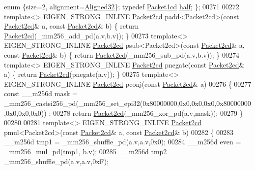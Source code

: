 \begin{DoxyCode}
{      enum} \{size=2, alignment=\hyperlink{group__enums_gga45fe06e29902b7a2773de05ba27b47a1a7797d247b86f6e9837cc338beb6060de}{Aligned32}\}; \textcolor{keyword}{typedef} \hyperlink{struct_eigen_1_1internal_1_1_packet1cd}{Packet1cd} \hyperlink{struct_eigen_1_1internal_1_1_packet1cd}{half}; \};
00271 
00272 \textcolor{keyword}{template}<> EIGEN\_STRONG\_INLINE \hyperlink{struct_eigen_1_1internal_1_1_packet2cd}{Packet2cd} padd<Packet2cd>(\textcolor{keyword}{const} 
      \hyperlink{struct_eigen_1_1internal_1_1_packet2cd}{Packet2cd}& a, \textcolor{keyword}{const} \hyperlink{struct_eigen_1_1internal_1_1_packet2cd}{Packet2cd}& b) \{ \textcolor{keywordflow}{return} \hyperlink{struct_eigen_1_1internal_1_1_packet2cd}{Packet2cd}(\_mm256\_add\_pd(a.v,b.v)); \}
00273 \textcolor{keyword}{template}<> EIGEN\_STRONG\_INLINE \hyperlink{struct_eigen_1_1internal_1_1_packet2cd}{Packet2cd} psub<Packet2cd>(\textcolor{keyword}{const} 
      \hyperlink{struct_eigen_1_1internal_1_1_packet2cd}{Packet2cd}& a, \textcolor{keyword}{const} \hyperlink{struct_eigen_1_1internal_1_1_packet2cd}{Packet2cd}& b) \{ \textcolor{keywordflow}{return} \hyperlink{struct_eigen_1_1internal_1_1_packet2cd}{Packet2cd}(\_mm256\_sub\_pd(a.v,b.v)); \}
00274 \textcolor{keyword}{template}<> EIGEN\_STRONG\_INLINE \hyperlink{struct_eigen_1_1internal_1_1_packet2cd}{Packet2cd} pnegate(\textcolor{keyword}{const} \hyperlink{struct_eigen_1_1internal_1_1_packet2cd}{Packet2cd}& a) \{ \textcolor{keywordflow}{return} 
      \hyperlink{struct_eigen_1_1internal_1_1_packet2cd}{Packet2cd}(pnegate(a.v)); \}
00275 \textcolor{keyword}{template}<> EIGEN\_STRONG\_INLINE \hyperlink{struct_eigen_1_1internal_1_1_packet2cd}{Packet2cd} pconj(\textcolor{keyword}{const} \hyperlink{struct_eigen_1_1internal_1_1_packet2cd}{Packet2cd}& a)
00276 \{
00277   \textcolor{keyword}{const} \_\_m256d mask = \_mm256\_castsi256\_pd(\_mm256\_set\_epi32(0x80000000,0x0,0x0,0x0,0x80000000,0x0,0x0,0x0))
      ;
00278   \textcolor{keywordflow}{return} \hyperlink{struct_eigen_1_1internal_1_1_packet2cd}{Packet2cd}(\_mm256\_xor\_pd(a.v,mask));
00279 \}
00280 
00281 \textcolor{keyword}{template}<> EIGEN\_STRONG\_INLINE \hyperlink{struct_eigen_1_1internal_1_1_packet2cd}{Packet2cd} pmul<Packet2cd>(\textcolor{keyword}{const} 
      \hyperlink{struct_eigen_1_1internal_1_1_packet2cd}{Packet2cd}& a, \textcolor{keyword}{const} \hyperlink{struct_eigen_1_1internal_1_1_packet2cd}{Packet2cd}& b)
00282 \{
00283   \_\_m256d tmp1 = \_mm256\_shuffle\_pd(a.v,a.v,0x0);
00284   \_\_m256d even = \_mm256\_mul\_pd(tmp1, b.v);
00285   \_\_m256d tmp2 = \_mm256\_shuffle\_pd(a.v,a.v,0xF);

\end{DoxyCode}
